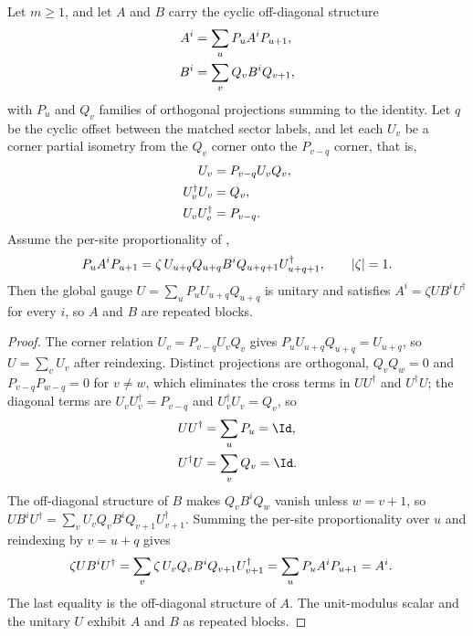 \begin{lemma}
    \label{lem:periodic_global_gauge_assembly}
    \leanok
    Let $m\ge1$, and let $A$ and $B$ carry the cyclic off-diagonal structure
    \begin{align}
        A^i & =\sum_uP_uA^iP_{u+1}, \notag \\
        B^i & =\sum_vQ_vB^iQ_{v+1}, \notag
    \end{align}
    with $P_u$ and $Q_v$ families of orthogonal projections summing to the
    identity. Let $q$ be the cyclic offset between the matched sector labels,
    and let each $U_v$ be a corner partial isometry from the $Q_v$ corner onto
    the $P_{v-q}$ corner, that is,
    \begin{align}
        U_v             & =P_{v-q}U_vQ_v, \notag \\
        U_v^\dagger U_v & =Q_v, \notag           \\
        U_vU_v^\dagger  & =P_{v-q}. \notag
    \end{align}
    Assume the per-site proportionality of
    \cite[eq.~result]{DeLasCuevas2017Irreducible},
    \begin{align}
        P_uA^iP_{u+1}
        =
        \zeta\,U_{u+q}Q_{u+q}B^iQ_{u+q+1}U_{u+q+1}^\dagger,
        \qquad
        |\zeta|=1. \notag
    \end{align}
    Then the global gauge
    $U=\sum_uP_uU_{u+q}Q_{u+q}$ is unitary and satisfies
    $A^i=\zeta UB^iU^\dagger$ for every $i$, so $A$ and $B$ are repeated
    blocks.
\end{lemma}

\begin{proof}\leanok
    The corner relation $U_v=P_{v-q}U_vQ_v$ gives
    $P_uU_{u+q}Q_{u+q}=U_{u+q}$, so $U=\sum_vU_v$ after reindexing. Distinct
    projections are orthogonal, $Q_vQ_w=0$ and $P_{v-q}P_{w-q}=0$ for
    $v\ne w$, which eliminates the cross terms in $UU^\dagger$ and $U^\dagger U$;
    the diagonal terms are $U_vU_v^\dagger=P_{v-q}$ and
    $U_v^\dagger U_v=Q_v$, so
    \begin{align}
        UU^\dagger  & =\sum_uP_u=\Id, \notag \\
        U^\dagger U & =\sum_vQ_v=\Id. \notag
    \end{align}
    The off-diagonal structure of $B$ makes $Q_vB^iQ_w$ vanish unless
    $w=v+1$, so
    $UB^iU^\dagger=\sum_vU_vQ_vB^iQ_{v+1}U_{v+1}^\dagger$. Summing the
    per-site proportionality over $u$ and reindexing by $v=u+q$ gives
    \begin{align}
        \zeta UB^iU^\dagger
         & =
        \sum_v\zeta\,U_vQ_vB^iQ_{v+1}U_{v+1}^\dagger
        =
        \sum_uP_uA^iP_{u+1}
        =A^i. \notag
    \end{align}
    The last equality is the off-diagonal structure of $A$. The unit-modulus
    scalar and the unitary $U$ exhibit $A$ and $B$ as repeated blocks.
\end{proof}
